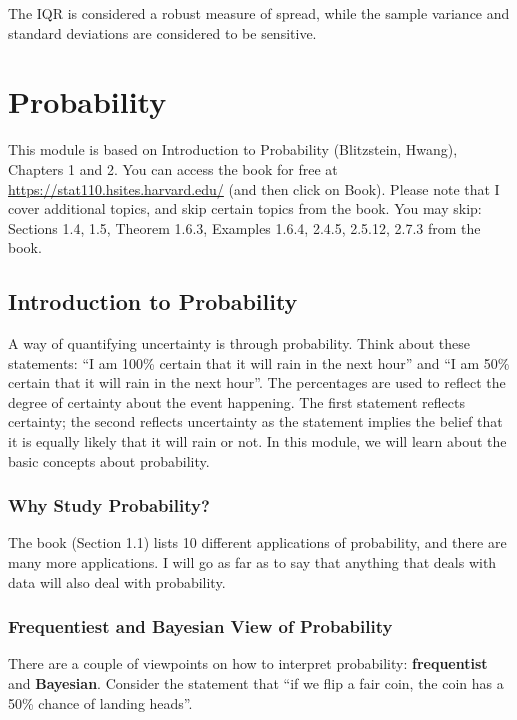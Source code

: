 \documentclass[
]{book}
\begin{document}
The IQR is considered a robust measure of spread, while the sample variance and standard deviations are considered to be sensitive.

\chapter{Probability}\label{probability}

This module is based on Introduction to Probability (Blitzstein, Hwang), Chapters 1 and 2. You can access the book for free at \url{https://stat110.hsites.harvard.edu/} (and then click on Book). Please note that I cover additional topics, and skip certain topics from the book. You may skip: Sections 1.4, 1.5, Theorem 1.6.3, Examples 1.6.4, 2.4.5, 2.5.12, 2.7.3 from the book.

\section{Introduction to Probability}\label{introduction-to-probability}

A way of quantifying uncertainty is through probability. Think about these statements: ``I am 100\% certain that it will rain in the next hour'' and ``I am 50\% certain that it will rain in the next hour''. The percentages are used to reflect the degree of certainty about the event happening. The first statement reflects certainty; the second reflects uncertainty as the statement implies the belief that it is equally likely that it will rain or not. In this module, we will learn about the basic concepts about probability.

\subsection{Why Study Probability?}\label{why-study-probability}

The book (Section 1.1) lists 10 different applications of probability, and there are many more applications. I will go as far as to say that anything that deals with data will also deal with probability.

\subsection{Frequentiest and Bayesian View of Probability}\label{frequentiest-and-bayesian-view-of-probability}

There are a couple of viewpoints on how to interpret probability: \textbf{frequentist} and \textbf{Bayesian}. Consider the statement that ``if we flip a fair coin, the coin has a 50\% chance of landing heads''.
\end{document}
